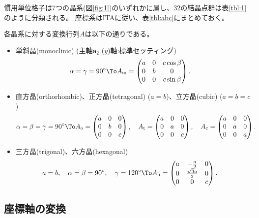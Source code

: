 \documentclass[11pt]{easymemo}
\begin{document}
慣用単位格子は7つの晶系(図\ref{fig:1})のいずれかに属し、32の結晶点群は表\ref{tbl:1}のように分類される。
座標系はITAに従い、表\ref{tbl:abc}にまとめておく。

各晶系に対する変換行列$A$は以下の通りである。
\begin{itemize}
\item 単斜晶(monoclinic) (主軸$\bm{a}_{2}$ ($y$)軸:標準セッティング)
\begin{align}
   &
  \alpha=\gamma=90^{\circ}
  \To
  A_{\rm m}=\begin{pmatrix}
    a & 0 & c\cos\beta \\
    0 & b & 0          \\
    0 & 0 & c\sin\beta
  \end{pmatrix}.
\end{align}
\item 直方晶(orthorhombic)、正方晶(tetragonal) ($a=b$)、立方晶(cubic) ($a=b=c$)
\begin{align}
   &
  \alpha=\beta=\gamma=90^{\circ}
  \To
  A_{\rm o}=\begin{pmatrix}
    a & 0 & 0 \\
    0 & b & 0 \\
    0 & 0 & c
  \end{pmatrix},
  \quad
  A_{\rm t}=\begin{pmatrix}
    a & 0 & 0 \\
    0 & a & 0 \\
    0 & 0 & c
  \end{pmatrix},
  \quad
  A_{\rm c}=\begin{pmatrix}
    a & 0 & 0 \\
    0 & a & 0 \\
    0 & 0 & a
  \end{pmatrix}.
\end{align}
\item 三方晶(trigonal)、六方晶(hexagonal)
\begin{align}
   &
  a=b,
  \quad
  \alpha=\beta=90^{\circ},
  \quad
  \gamma=120^{\circ}
  \To
  A_{\rm h}=\begin{pmatrix}
    a & -\frac{a}{2}        & 0 \\
    0 & \frac{\sqrt{3}a}{2} & 0 \\
    0 & 0                   & c
  \end{pmatrix}.
\end{align}
\end{itemize}


\subsection{座標軸の変換}
\end{document}
